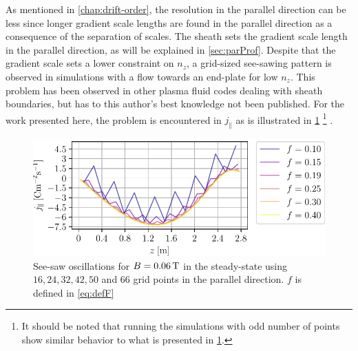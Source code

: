 As mentioned in \cref{chap:drift-order}, the resolution in the parallel direction can be less since longer gradient scale lengths are found in the parallel direction as a consequence of the separation of scales.
The sheath sets the gradient scale length in the parallel direction, as will be explained in \cref{sec:parProf}.
Despite that the gradient scale sets a lower constraint on $n_z$, a grid-sized see-sawing pattern is observed in simulations with a flow towards an end-plate for low $n_z$.
This problem has been observed in other plasma fluid codes dealing with sheath boundaries, but has to this author's best knowledge not been published.
For the work presented here, the problem is encountered in $j_\|$ as is illustrated in \cref{fig:see-saw}%
\footnote{It should be noted that running the simulations with odd number of points show similar behavior to what is presented in \cref{fig:see-saw}.}%
%
.
%
\begin{figure}[htb]
    \centering
    \includegraphics{fig/results/jParRipple006}
    \caption{See-saw oscillations for $B=0.06\, \text{T}$ in the steady-state using $16, 24, 32, 42, 50$ and $66$ grid points in the parallel direction.
        $f$ is defined in \cref{eq:defF}
    }
    \label{fig:see-saw}
\end{figure}
%

